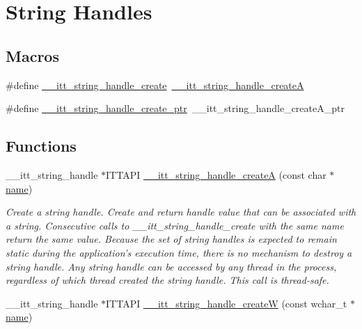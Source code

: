 \hypertarget{group__handless}{\section{String Handles}
\label{group__handless}
}
\subsection*{Macros}
\begin{DoxyCompactItemize}
\item 
\#define \hyperlink{group__handless_ga0a723522866c77dbe13ace2d32ee429c}{\-\_\-\-\_\-itt\-\_\-string\-\_\-handle\-\_\-create}~\hyperlink{group__handless_ga353ab13a4b9325ded923c1c951f6f849}{\-\_\-\-\_\-itt\-\_\-string\-\_\-handle\-\_\-create\-A}
\item 
\#define \hyperlink{group__handless_ga4af0e0826a5b33bf0d9ed25746419936}{\-\_\-\-\_\-itt\-\_\-string\-\_\-handle\-\_\-create\-\_\-ptr}~\-\_\-\-\_\-itt\-\_\-string\-\_\-handle\-\_\-create\-A\-\_\-ptr
\end{DoxyCompactItemize}
\subsection*{Functions}
\begin{DoxyCompactItemize}
\item 
\-\_\-\-\_\-itt\-\_\-string\-\_\-handle $\ast$I\-T\-T\-A\-P\-I \hyperlink{group__handless_ga353ab13a4b9325ded923c1c951f6f849}{\-\_\-\-\_\-itt\-\_\-string\-\_\-handle\-\_\-create\-A} (const char $\ast$\hyperlink{ittnotify__static_8h_a1c34b35a4952969fef60192313bba34a}{name})
\begin{DoxyCompactList}\small\item\em Create a string handle. Create and return handle value that can be associated with a string. Consecutive calls to \-\_\-\-\_\-itt\-\_\-string\-\_\-handle\-\_\-create with the same name return the same value. Because the set of string handles is expected to remain static during the application's execution time, there is no mechanism to destroy a string handle. Any string handle can be accessed by any thread in the process, regardless of which thread created the string handle. This call is thread-\/safe. \end{DoxyCompactList}\item 
\-\_\-\-\_\-itt\-\_\-string\-\_\-handle $\ast$I\-T\-T\-A\-P\-I \hyperlink{group__handless_ga01b031a1ec465e650ccfacae18a3c121}{\-\_\-\-\_\-itt\-\_\-string\-\_\-handle\-\_\-create\-W} (const wchar\-\_\-t $\ast$\hyperlink{ittnotify__static_8h_a1c34b35a4952969fef60192313bba34a}{name})
\end{DoxyCompactItemize}


